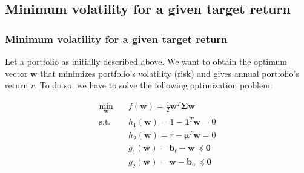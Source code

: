 \documentclass{beamer}
\begin{document}
\subsection{Minimum volatility for a given target return}

\begin{frame}
\frametitle{\textbf{Minimum volatility for a given target return}}

\justifying
Let a portfolio as initially described above. We want to obtain the optimum vector $\mathbf{w}$ that minimizes portfolio's volatility (risk) and gives annual portfolio's return $r$. To do so, we have to solve the following optimization problem:

\vspace{0.2cm}
\justifying
\begin{equation}
\label{eq:7}
\begin{aligned}
\min_{\mathbf{w}} \quad & f\left(\mathbf{w}\right) = \frac{1}{2}\mathbf{w}^{T}\mathbf{\Sigma}\mathbf{w} \\
\textrm{s.t.} \quad & h_{1}\left(\mathbf{w}\right) = 1 - \mathbf{1}^{T} \mathbf{w} = 0 \\
                             & h_{2}\left(\mathbf{w}\right) = r - \boldsymbol\mu^{T} \mathbf{w} = 0 \\
                             & g_{1}\left(\mathbf{w}\right) = \mathbf{b}_{\ell} - \mathbf{w} \preccurlyeq \mathbf{0} \\
                             & g_{2}\left(\mathbf{w}\right) = \mathbf{w} - \mathbf{b}_{u} \preccurlyeq \mathbf{0} \\
\end{aligned}
\end{equation}

\end{frame}
\end{document}
